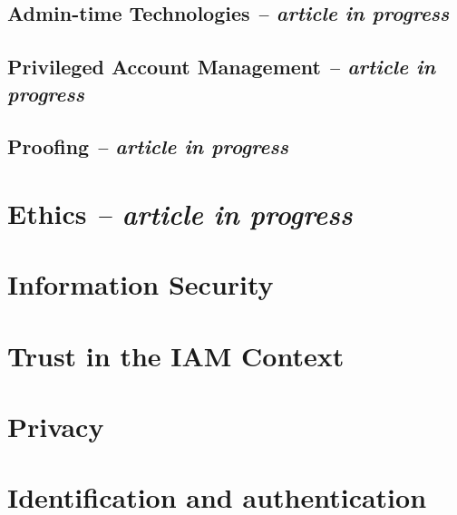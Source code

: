 \hypertarget{admin-time-technologies-article-in-progress}{%
\subsection{\texorpdfstring{Admin-time Technologies \emph{-- article
in
progress}}{Admin-time Technologies -- article in progress}}\label{admin-time-technologies-article-in-progress}}

\hypertarget{privileged-account-management-article-in-progress}{%
\subsection{\texorpdfstring{Privileged Account Management \emph{--
article in
progress}}{Privileged Account Management -- article in progress}}\label{privileged-account-management-article-in-progress}}

\hypertarget{proofing-article-in-progress}{%
\subsection{\texorpdfstring{Proofing \emph{-- article in
progress}}{Proofing -- article in progress}}\label{proofing-article-in-progress}}

\hypertarget{ethics-article-in-progress}{%
\section{\texorpdfstring{Ethics \emph{-- article in
progress}}{Ethics -- article in progress}}\label{ethics-article-in-progress}}

\hypertarget{information-security}{%
\section{Information Security}\label{information-security}}

\hypertarget{trust-in-the-iam-context}{%
\section{Trust in the IAM Context}\label{trust-in-the-iam-context}}

\hypertarget{privacy}{%
\section{Privacy}\label{privacy}}

\hypertarget{identification-and-authentication}{%
\section{Identification and
authentication}\label{identification-and-authentication}}


